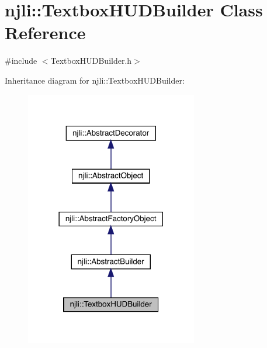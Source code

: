 \hypertarget{classnjli_1_1_textbox_h_u_d_builder}{}\section{njli\+:\+:Textbox\+H\+U\+D\+Builder Class Reference}
\label{classnjli_1_1_textbox_h_u_d_builder}


{\ttfamily \#include $<$Textbox\+H\+U\+D\+Builder.\+h$>$}



Inheritance diagram for njli\+:\+:Textbox\+H\+U\+D\+Builder\+:\nopagebreak
\begin{figure}[H]
\begin{center}
\leavevmode
\includegraphics[width=213pt]{classnjli_1_1_textbox_h_u_d_builder__inherit__graph}
\end{center}
\end{figure}



